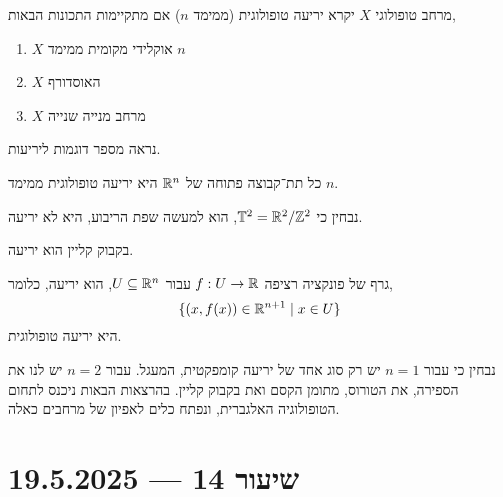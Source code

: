 \begin{definition}
	מרחב טופולוגי $X$ יקרא יריעה טופולוגית (ממימד $n$) אם מתקיימות התכונות הבאות,
	\begin{enumerate}
		\item $X$ אוקלידי מקומית ממימד $n$
		\item $X$ האוסדורף
		\item $X$ מרחב מנייה שנייה
	\end{enumerate}
\end{definition}
נראה מספר דוגמות ליריעות.
\begin{example}
	כל תת־קבוצה פתוחה של $\mathbb{R}^n$ היא יריעה טופולוגית ממימד $n$.
\end{example}
\begin{example}
	נבחין כי $\mathbb{T}^2 = \mathbb{R}^2 / \mathbb{Z}^2$, הוא למעשה שפת הריבוע, היא לא יריעה.
\end{example}
\begin{example}
	בקבוק קליין הוא יריעה.
\end{example}
\begin{example}
	גרף של פונקציה רציפה $f : U \to \mathbb{R}$ עבור $U \subseteq \mathbb{R}^n$, הוא יריעה, כלומר,
	\[
		\{ (x, f(x)) \in \mathbb{R}^{n + 1} \mid x \in U \}
	\]
	היא יריעה טופולוגית.
\end{example}
נבחין כי עבור $n = 1$ יש רק סוג אחד של יריעה קומפקטית, המעגל.
עבור $n = 2$ יש לנו את הספירה, את הטורוס, מתומן הקסם ואת בקבוק קליין.
בהרצאות הבאות ניכנס לתחום הטופולוגיה האלגברית, ונפתח כלים לאפיון של מרחבים כאלה.

\section{שיעור 14 --- 19.5.2025}
